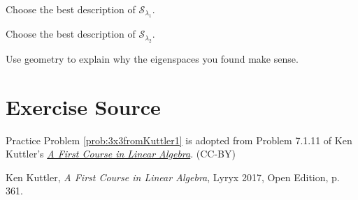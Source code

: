 \documentclass{ximera}
\begin{document}
\begin{problem}
\begin{problem}
Choose the best description of $\mathcal{S}_{\lambda_1}$.
\begin{multipleChoice}
\end{multipleChoice}

Choose the best description of $\mathcal{S}_{\lambda_2}$.
\begin{multipleChoice}
\end{multipleChoice}

Use geometry to explain why the eigenspaces you found make sense.

\end{problem}
\end{problem}

\section*{Exercise Source}
Practice Problem \ref{prob:3x3fromKuttler1} is adopted from Problem 7.1.11 of Ken Kuttler's \href{https://open.umn.edu/opentextbooks/textbooks/a-first-course-in-linear-algebra-2017}{\it A First Course in Linear Algebra}. (CC-BY)

Ken Kuttler, {\it  A First Course in Linear Algebra}, Lyryx 2017, Open Edition, p. 361.
\end{document}
